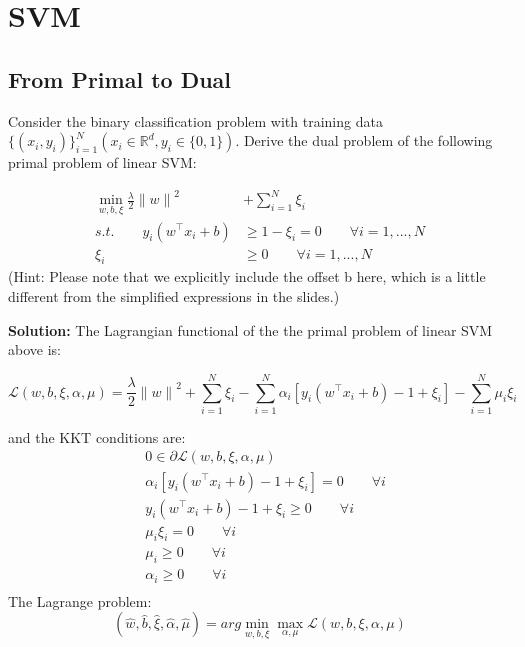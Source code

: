 \documentclass[a4paper]{article}
\begin{document}
\section{SVM}


\subsection{From Primal to Dual}

Consider the binary classification problem with training data $\{(x_i , y_i )\}^{N}_{i=1} (x_i \in \mathbb{R}^d , y_i \in \{0, 1\})$. Derive the dual problem of the following primal problem of linear SVM:

\begin{equation}
    \begin{aligned}
        \min_{w, b, \xi}    \frac{\lambda}{2}{\|w\|}^2 &+ \sum_{i=1}^{N} \xi_i \\
        s.t.\qquad  y_i(w^{\top} x_i + b) &\ge 1- \xi_i =0 \qquad \forall i =1,...,N\\
        \xi_i &\ge 0 \qquad \forall i =1,...,N
    \end{aligned}
\end{equation}
(Hint: Please note that we explicitly include the offset b here, which is a little
different from the simplified expressions in the slides.)

\textbf{Solution:} The Lagrangian functional of the the primal problem  of linear SVM above is:

\begin{equation}
   \mathcal{L}(w,b,\xi,\alpha, \mu) =  \frac{\lambda}{2}{\|w\|}^2 + \sum_{i=1}^{N} \xi_i - \sum_{i=1}^{N} \alpha_i [y_i(w^{\top} x_i + b) - 1+\xi_i] - \sum_{i=1}^{N} \mu_i \xi_i 
\end{equation}

and the KKT conditions are:
\begin{equation}
    \begin{aligned}
        & 0 \in \partial \mathcal{L}(w,b,\xi,\alpha,\mu) \\
        &\alpha_i [y_i(w^{\top} x_i + b) - 1+\xi_i] =0 \qquad \forall i \\
        & y_i(w^{\top} x_i + b) - 1+\xi_i \ge 0 \qquad \forall i\\
        & \mu_i \xi_i = 0 \qquad \forall i\\
        & \mu_i \ge 0 \qquad \forall i\\
        & \alpha_i \ge 0 \qquad \forall i\\
    \end{aligned}
\end{equation}
The Lagrange problem:
\begin{equation}
   (\hat{w}, \hat{b},\hat{\xi},\hat{\alpha},\hat{\mu}) = arg \min_{w,b,\xi} \max_{\alpha,\mu}\mathcal{L}(w,b,\xi,\alpha,\mu) 
\end{equation}
\end{document}
